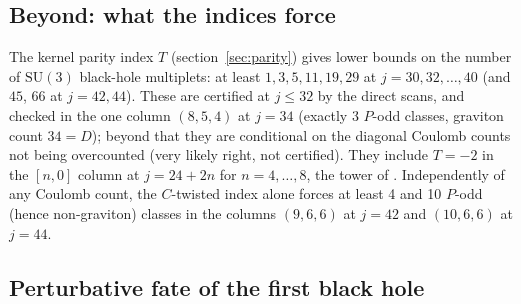 \documentclass[11pt]{article}
\newcommand{\SU}{\mathrm{SU}}
\begin{document}
\subsection{Beyond: what the indices force}\label{sec:su3beyond}

The kernel parity index $T$ (section~\ref{sec:parity}) gives lower bounds on the number of $\SU(3)$ black-hole
multiplets: at least $1,3,5,11,19,29$ at $j=30,32,\dots,40$ (and $45$, $66$ at $j=42,44$). These are certified at
$j\le32$ by the direct scans, and checked in the one column $(8,5,4)$ at $j=34$ (exactly 3 $P$-odd classes, graviton
count $34=D$); beyond that they are conditional on the diagonal Coulomb counts not being overcounted (very likely
right, not certified). They include $T=-2$ in the $[n,0]$ column at $j=24+2n$ for $n=4,\dots,8$, the tower of
\cite{dMK}. Independently of any Coulomb count, the $C$-twisted index alone forces at least 4 and 10 $P$-odd (hence
non-graviton) classes in the columns $(9,6,6)$ at $j=42$ and $(10,6,6)$ at $j=44$.

\subsection{Perturbative fate of the first black hole}\label{sec:su3pert}
\end{document}
